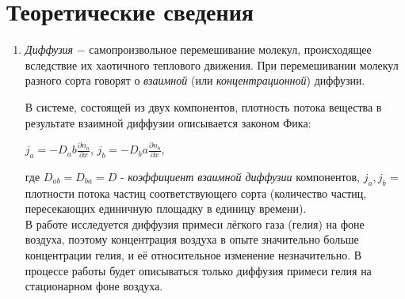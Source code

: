 \documentclass[12pt,a4paper]{article}
\begin{document}
\section{Теоретические сведения}
\begin{enumerate}
\item {\sl Диффузия} $-$ самопроизвольное перемешивание молекул, происходящее вследствие их хаотичного теплового движения. При перемешивании молекул разного сорта говорят о {\sl взаимной} (или {\sl концентрационной}) диффузии.

В системе, состоящей из двух компонентов, плотность потока вещества в результате взаимной диффузии описывается законом Фика:
\begin{center}
$j_a = -D_ab\frac{\partial n_a}{\partial x}$, $j_b = -D_ba\frac{\partial n_b}{\partial x}$,
\end{center}
где $D_{ab} = D_{ba} = D$ - {\sl коэффициент взаимной диффузии} компонентов, $j_{a},j_{b}$ = плотности потока частиц соответствующего сорта (количество частиц, пересекающих единичную площадку в единицу времени).\\
В работе исследуется диффузия примеси лёгкого газа (гелия) на фоне воздуха, поэтому концентрация воздуха в опыте значительно больше концентрации гелия, и её относительное изменение незначительно. В процессе работы будет описываться только диффузия примеси гелия на стационарном фоне воздуха.\\


\end{enumerate}
\end{document}
